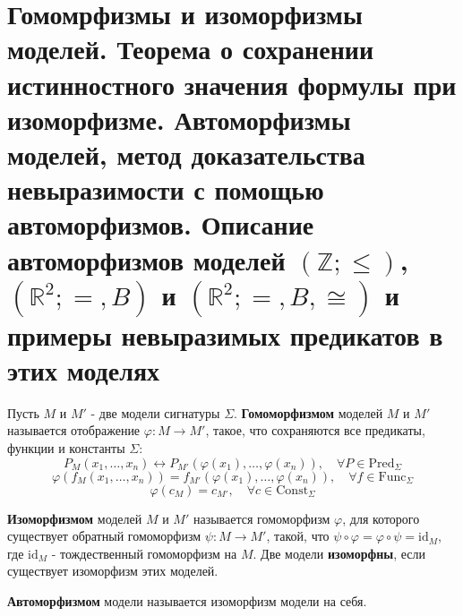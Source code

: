 \section{Гомомрфизмы и изоморфизмы моделей. Теорема о сохранении истинностного значения формулы при изоморфизме.
Автоморфизмы моделей, метод доказательства невыразимости с помощью автоморфизмов. Описание автоморфизмов моделей
$(\mathbb Z;\leqslant)$,$(\mathbb R^2;=,B)$ и $(\mathbb R^2;=,B,\cong)$ и примеры невыразимых предикатов в этих
моделях}
\begin{definition}
	Пусть $M$ и $M'$ - две модели сигнатуры $\Sigma$. \textbf{Гомоморфизмом} моделей $M$ и $M'$ называется
	отображение $\varphi\colon M\to M'$, такое, что сохраняются все предикаты, функции и константы $\Sigma$:
	$$
		P_M(x_1,\ldots,x_n) \leftrightarrow P_{M'}(\varphi(x_1),\ldots,\varphi(x_n)),\quad\forall P\in
		\mathrm{Pred}_\Sigma
	$$
	$$
		\varphi(f_M(x_1,\ldots,x_n)) = f_{M'}(\varphi(x_1),\ldots,\varphi(x_n)),\quad\forall f\in\mathrm{Func}_\Sigma
	$$
	$$
		\varphi(c_M) = c_{M'},\quad\forall c\in\mathrm{Const}_\Sigma
	$$
\end{definition}
\begin{definition}
	\textbf{Изоморфизмом} моделей $M$ и $M'$ называется гомоморфизм $\varphi$, для которого существует обратный
	гомоморфизм $\psi\colon M\to M'$, такой, что $\psi\circ\varphi =\varphi\circ\psi =\mathrm{id}_M$, где
	$\mathrm{id}_M$ - тождественный гомоморфизм на $M$.
	Две модели \textbf{изоморфны}, если существует изоморфизм этих моделей.
\end{definition}
\begin{definition}
	\textbf{Автоморфизмом} модели называется изоморфизм модели на себя.
\end{definition}
\begin{theorem}

\end{theorem}
